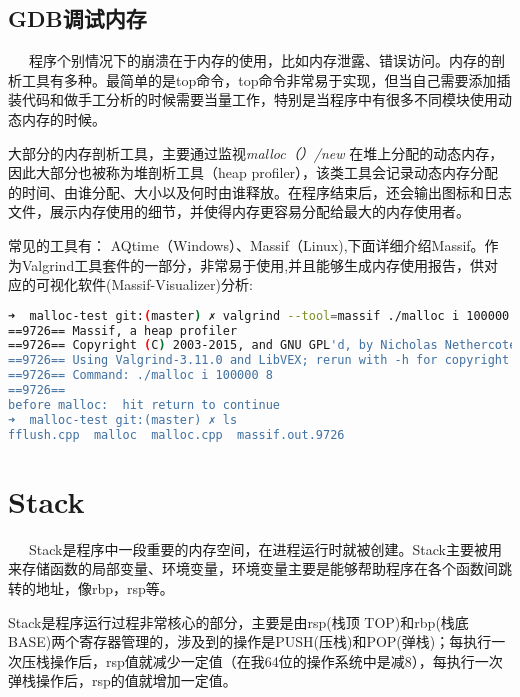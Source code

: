 \documentclass[12pt]{article}  %
\begin{document}
\subsection{GDB调试内存}
\ \ \ 程序个别情况下的崩溃在于内存的使用，比如内存泄露、错误访问。内存的剖析工具有多种。最简单的是top命令，top命令非常易于实现，但当自己需要添加插装代码和做手工分析的时候需要当量工作，特别是当程序中有很多不同模块使用动态内存的时候。
\par
大部分的内存剖析工具，主要通过监视\emph{malloc（）/new }在堆上分配的动态内存，因此大部分也被称为堆剖析工具（heap profiler），该类工具会记录动态内存分配的时间、由谁分配、大小以及何时由谁释放。在程序结束后，还会输出图标和日志文件，展示内存使用的细节，并使得内存更容易分配给最大的内存使用者。
\par
常见的工具有： AQtime（Windows）、Massif（Linux),下面详细介绍Massif。作为Valgrind工具套件的一部分，非常易于使用,并且能够生成内存使用报告，供对应的可视化软件(Massif-Visualizer)分析:
\begin{lstlisting}[language=sh]
➜  malloc-test git:(master) ✗ valgrind --tool=massif ./malloc i 100000 8
==9726== Massif, a heap profiler
==9726== Copyright (C) 2003-2015, and GNU GPL'd, by Nicholas Nethercote
==9726== Using Valgrind-3.11.0 and LibVEX; rerun with -h for copyright info
==9726== Command: ./malloc i 100000 8
==9726== 
before malloc:  hit return to continue
➜  malloc-test git:(master) ✗ ls
fflush.cpp  malloc  malloc.cpp  massif.out.9726

\end{lstlisting}
\section{Stack} %
\ \ \ Stack是程序中一段重要的内存空间，在进程运行时就被创建。Stack主要被用来存储函数的局部变量、环境变量，环境变量主要是能够帮助程序在各个函数间跳转的地址，像rbp，rsp等。\par
Stack是程序运行过程非常核心的部分，主要是由rsp(栈顶 TOP)和rbp(栈底 BASE)两个寄存器管理的，涉及到的操作是PUSH(压栈)和POP(弹栈)；每执行一次压栈操作后，rsp值就减少一定值（在我64位的操作系统中是减8），每执行一次弹栈操作后，rsp的值就增加一定值。\par
\end{document}
